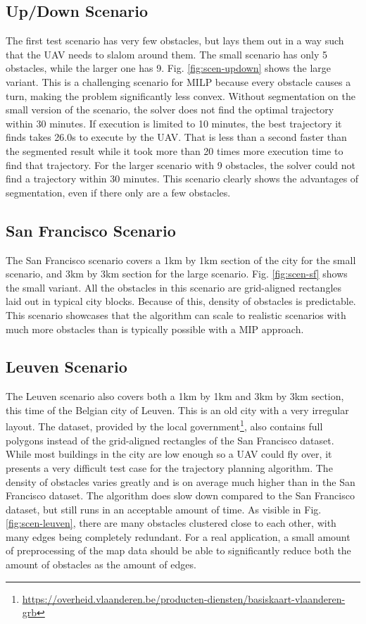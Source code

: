 \subsection{Up/Down Scenario}
The first test scenario has very few obstacles, but lays them out in a way such that the UAV needs to slalom around them. The small scenario has only 5 obstacles, while the larger one has 9. Fig. \ref{fig:scen-updown} shows the large variant. This is a challenging scenario for MILP because every obstacle causes a turn, making the problem significantly less convex. Without segmentation on the small version of the scenario, the solver does not find the optimal trajectory within 30 minutes. If execution is limited to 10 minutes, the best trajectory it finds takes 26.0s to execute by the UAV. That is less than a second faster than the segmented result while it took more than 20 times more execution time to find that trajectory. For the larger scenario with 9 obstacles, the solver could not find a trajectory within 30 minutes. This scenario clearly shows the advantages of segmentation, even if there only are a few obstacles.

\subsection{San Francisco Scenario}
The San Francisco scenario covers a 1km by 1km section of the city for the small scenario, and 3km by 3km section for the large scenario. Fig. \ref{fig:scen-sf} shows the small variant. All the obstacles in this scenario are grid-aligned rectangles laid out in typical city blocks. Because of this, density of obstacles is predictable. This scenario showcases that the algorithm can scale to realistic scenarios with much more obstacles than is typically possible with a MIP approach. 

\subsection{Leuven Scenario}
The Leuven scenario also covers both a 1km by 1km and 3km by 3km section, this time of the Belgian city of Leuven. This is an old city with a very irregular layout. The dataset, provided by the local government\footnote{\url{https://overheid.vlaanderen.be/producten-diensten/basiskaart-vlaanderen-grb}}, also contains full polygons instead of the grid-aligned rectangles of the San Francisco dataset. While most buildings in the city are low enough so a UAV could fly over, it presents a very difficult test case for the trajectory planning algorithm. The density of obstacles varies greatly and is on average much higher than in the San Francisco dataset. The algorithm does slow down compared to the San Francisco dataset, but still runs in an acceptable amount of time. As visible in Fig. \ref{fig:scen-leuven}, there are many obstacles clustered close to each other, with many edges being completely redundant. For a real application, a small amount of preprocessing of the map data should be able to significantly reduce both the amount of obstacles as the amount of edges. 

